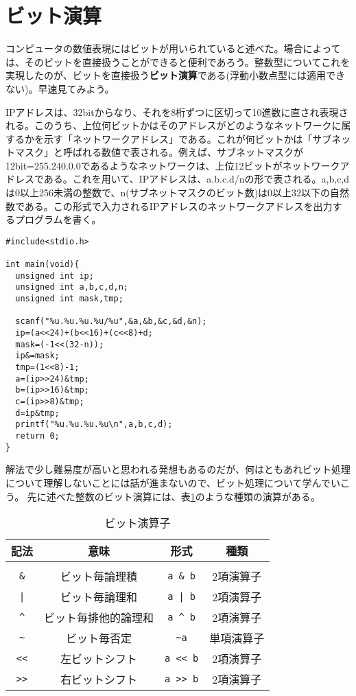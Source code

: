 \section{ビット演算}
コンピュータの数値表現にはビットが用いられていると述べた。場合によっては、そのビットを直接扱うことができると便利であろう。整数型についてこれを実現したのが、ビットを直接扱う\textbf{ビット演算}である(浮動小数点型には適用できない)。早速見てみよう。
\begin{boxnote}
IPアドレスは、32bitからなり、それを8桁ずつに区切って10進数に直され表現される。このうち、上位何ビットかはそのアドレスがどのようなネットワークに属するかを示す「ネットワークアドレス」である。これが何ビットかは「サブネットマスク」と呼ばれる数値で表される。例えば、サブネットマスクが12bit=255.240.0.0であるようなネットワークは、上位12ビットがネットワークアドレスである。これを用いて、IPアドレスは、a.b.c.d/nの形で表される。a,b,c,dは0以上256未満の整数で、n(サブネットマスクのビット数)は0以上32以下の自然数である。この形式で入力されるIPアドレスのネットワークアドレスを出力するプログラムを書く。
\begin{lstlisting}[caption=IPv4からネットワークアドレスを求める,label=program3_2]
#include<stdio.h>

int main(void){
  unsigned int ip;
  unsigned int a,b,c,d,n;
  unsigned int mask,tmp;

  scanf("%u.%u.%u.%u/%u",&a,&b,&c,&d,&n);
  ip=(a<<24)+(b<<16)+(c<<8)+d;
  mask=(-1<<(32-n));
  ip&=mask;
  tmp=(1<<8)-1;
  a=(ip>>24)&tmp;
  b=(ip>>16)&tmp;
  c=(ip>>8)&tmp;
  d=ip&tmp;
  printf("%u.%u.%u.%u\n",a,b,c,d);
  return 0;
}

\end{lstlisting}
\end{boxnote}
解法で少し難易度が高いと思われる発想もあるのだが、何はともあれビット処理について理解しないことには話が進まないので、ビット処理について学んでいこう。
先に述べた整数のビット演算には、表\ref{bitope}のような種類の演算がある。
\begin{table}[!htb]
\centering
\caption{ビット演算子}\label{bitope}
\begin{tabular}{|c|c|c|c|}\hline
記法&意味&形式&種類\\ \hline
&&&\\[-15.5pt] \hline
\verb|&|&ビット毎論理積&\verb|a & b|&2項演算子\\ \hline
\verb/|/&ビット毎論理和&\verb/a | b/&2項演算子\\ \hline
\verb|^|&ビット毎排他的論理和&\verb|a ^ b|&2項演算子\\ \hline
\verb|~|&ビット毎否定&\verb|~a|&単項演算子\\ \hline
\verb|<<|&左ビットシフト&\verb|a << b|&2項演算子\\ \hline
\verb|>>|&右ビットシフト&\verb|a >> b|&2項演算子\\ \hline
\end{tabular}
\end{table}

